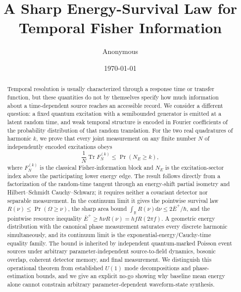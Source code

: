 \documentclass[aps,pra,reprint,amsmath,amssymb,longbibliography]{revtex4-2}
\newcommand{\Tr}{\operatorname{Tr}}
\newcommand{\dd}{\mathrm{d}}
\begin{document}
\title{A Sharp Energy-Survival Law for Temporal Fisher Information}

\author{Anonymous}
\date{\today}

\begin{abstract}
Temporal resolution is usually characterized through a response time or transfer function, but these quantities do not by themselves specify how much information about a time-dependent source reaches an accessible record.  We consider a different question: a fixed quantum excitation with a semibounded generator is emitted at a latent random time, and weak temporal structure is encoded in Fourier coefficients of the probability distribution of that random translation.  For the two real quadratures of harmonic $k$, we prove that every joint measurement on any finite number $N$ of independently encoded excitations obeys
\begin{equation}
 \frac{1}{N}\Tr F_N^{(k)}\leq \Pr(N_E\geq k),
\end{equation}
where $F_N^{(k)}$ is the classical Fisher-information block and $N_E$ is the excitation-sector index above the participating lower energy edge.  The result follows directly from a factorization of the random-time tangent through an energy-shift partial isometry and Hilbert--Schmidt Cauchy--Schwarz; it requires neither a covariant detector nor separable measurement.  In the continuum limit it gives the pointwise survival law $R(\nu)\leq\Pr(\Omega\geq\nu)$, the sharp area bound $\int_{\mathbb R}R(\nu)\dd\nu\leq2\bar E^+/\hbar$, and the pointwise resource inequality $\bar E^+\geq\hbar\nu R(\nu)=hfR(2\pi f)$.  A geometric energy distribution with the canonical phase measurement saturates every discrete harmonic simultaneously, and its continuum limit is the exponential-energy/Cauchy-time equality family.  The bound is inherited by independent quantum-marked Poisson event sources under arbitrary parameter-independent source-to-field dynamics, bosonic overlap, coherent detector memory, and final measurement.  We distinguish this operational theorem from established $U(1)$ mode decompositions and phase-estimation bounds, and we give an explicit no-go showing why baseline mean energy alone cannot constrain arbitrary parameter-dependent waveform-state synthesis.
\end{abstract}

\maketitle
\end{document}

